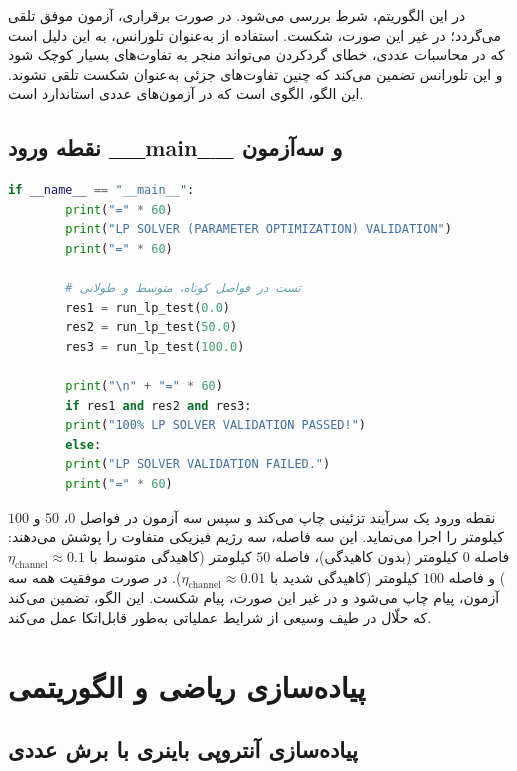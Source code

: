 در این الگوریتم، شرط  بررسی می‌شود. در صورت برقراری، آزمون موفق تلقی می‌گردد؛ در غیر این صورت، شکست. استفاده از  به‌عنوان تلورانس، به این دلیل است که در محاسبات عددی، خطای گردکردن می‌تواند منجر به تفاوت‌های بسیار کوچک شود و این تلورانس تضمین می‌کند که چنین تفاوت‌های جزئی به‌عنوان شکست تلقی نشوند. این الگو، الگوی  است که در آزمون‌های عددی استاندارد است.

\subsection{نقطه ورود \_\_main\_\_ و سه‌آزمون}

\begin{LTR}
	\begin{lstlisting}[language=Python]
		if __name__ == "__main__":
		print("=" * 60)
		print("LP SOLVER (PARAMETER OPTIMIZATION) VALIDATION")
		print("=" * 60)
		
		# تست در فواصل کوتاه، متوسط و طولانی
		res1 = run_lp_test(0.0)
		res2 = run_lp_test(50.0)
		res3 = run_lp_test(100.0)
		
		print("\n" + "=" * 60)
		if res1 and res2 and res3:
		print("100% LP SOLVER VALIDATION PASSED!")
		else:
		print("LP SOLVER VALIDATION FAILED.")
		print("=" * 60)
	\end{lstlisting}
\end{LTR}

نقطه ورود  یک سرآیند تزئینی چاپ می‌کند و سپس سه آزمون در فواصل $0$، $50$ و $100$ کیلومتر را اجرا می‌نماید. این سه فاصله، سه رژیم فیزیکی متفاوت را پوشش می‌دهند: فاصله $0$ کیلومتر (بدون کاهیدگی)، فاصله $50$ کیلومتر (کاهیدگی متوسط با $\eta_{\text{channel}} \approx 0.1$) و فاصله $100$ کیلومتر (کاهیدگی شدید با $\eta_{\text{channel}} \approx 0.01$). در صورت موفقیت همه سه آزمون، پیام  چاپ می‌شود و در غیر این صورت، پیام شکست. این الگو، تضمین می‌کند که حلّال در طیف وسیعی از شرایط عملیاتی به‌طور قابل‌اتکا عمل می‌کند.

\section{پیاده‌سازی ریاضی و الگوریتمی}

\subsection{پیاده‌سازی آنتروپی باینری با برش عددی}

